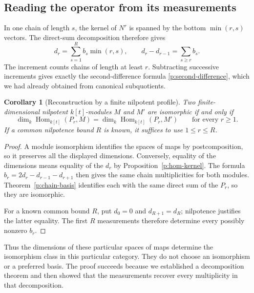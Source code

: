 \documentclass[11pt]{article}
\newtheorem{corollary}[theorem]{Corollary}
\theoremstyle{definition}
\theoremstyle{remark}\newtheorem{remark}[theorem]{Remark}
\DeclareMathOperator{\Hom}{Hom}
\begin{document}
\subsection{Reading the operator from its measurements}
\label{p:profile-reconstruction}

In one chain of length $s$, the kernel of $N^r$ is spanned by the bottom
$\min(r,s)$ vectors. The direct-sum decomposition therefore gives
\begin{equation}
\label{p:profile-formula}
 d_r=\sum_{s=1}^{R}b_s\min(r,s),\qquad
 d_r-d_{r-1}=\sum_{s\geq r}b_s.
\end{equation}
The increment counts chains of length at least $r$. Subtracting successive
increments gives exactly the second-difference formula
\eqref{p:second-difference}, which we had already obtained from canonical
subquotients.

\begin{corollary}[Reconstruction by a finite nilpotent profile]
\label{p:reconstruction}
Two finite-dimensional nilpotent $k[t]$-modules $M$ and $M'$ are isomorphic
if and only if
\[
 \dim_k\Hom_{k[t]}(P_r,M)=\dim_k\Hom_{k[t]}(P_r,M')
 \qquad\text{for every }r\geq1.
\]
If a common nilpotence bound $R$ is known, it suffices to use $1\leq r\leq R$.
\end{corollary}

\begin{proof}
A module isomorphism identifies the spaces of maps by postcomposition,
so it preserves all the displayed dimensions. Conversely, equality of
the dimensions means equality of the $d_r$ by
Proposition~\ref{p:hom-kernel}. The formula
$b_r=2d_r-d_{r-1}-d_{r+1}$ then gives the same chain multiplicities for
both modules. Theorem~\ref{p:chain-basis} identifies each with the same
direct sum of the $P_r$, so they are isomorphic.

For a known common bound $R$, put $d_0=0$ and $d_{R+1}=d_R$; nilpotence
justifies the latter equality. The first $R$ measurements therefore
determine every possibly nonzero $b_r$.
\end{proof}

Thus the dimensions of these particular spaces of maps determine the
isomorphism class in this particular category. They do not choose an
isomorphism or a preferred basis. The proof succeeds because we established
a decomposition theorem and then showed that the measurements recover
every multiplicity in that decomposition.
\end{document}
